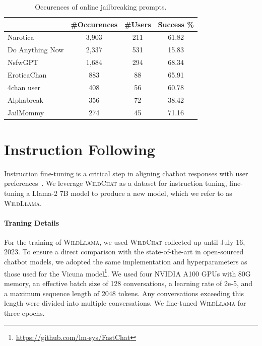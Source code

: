 \documentclass{article} %
\newcommand{\corpus}{\textsc{WildChat}\xspace}
\newcommand{\model}{\textsc{WildLlama}\xspace}
\begin{document}
\begin{table}[t]
\centering
\caption{\label{tab:jailbreaking-prompts}Occurences of online jailbreaking prompts.}
\begin{tabular}{@{}lccc@{}}
\toprule
            & \#Occurences & \#Users & Success \%\\ \midrule
Narotica    & 3,903          & 211   & 61.82\\
Do Anything Now& 2,337       & 531   & 15.83 \\
NsfwGPT     & 1,684          & 294   & 68.34\\
EroticaChan & 883           & 88     & 65.91\\
4chan user  & 408           & 56       & 60.78\\
Alphabreak  & 356           & 72     & 38.42\\
JailMommy   & 274           & 45     & 71.16\\
\bottomrule
\end{tabular}
\end{table}

\section{Instruction Following}
Instruction fine-tuning is a critical step in aligning chatbot responses with user preferences~\citep{touvron2023llama}. We leverage \corpus as a dataset for instruction tuning, fine-tuning a Llama-2 7B model to produce a new model, which we refer to as \model.

\paragraph{Traning Details}
For the training of \model, we used \corpus collected up until July 16, 2023. To ensure a direct comparison with the state-of-the-art in open-sourced chatbot models, we adopted the same implementation and hyperparameters as those used for the Vicuna model\footnote{\url{https://github.com/lm-sys/FastChat}}. We used four NVIDIA A100 GPUs with 80G memory, an effective batch size of 128 conversations, a learning rate of 2e-5, and a maximum sequence length of 2048 tokens. Any conversations exceeding this length were divided into multiple conversations. We fine-tuned \model for three epochs.
\end{document}
